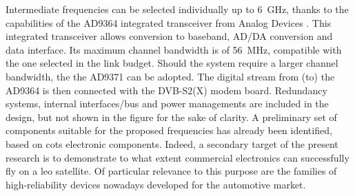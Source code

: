 \documentclass[conference,10pt,a4paper]{IEEEtran}%
\begin{document}
Intermediate frequencies can be selected individually up to \SI{6}{GHz}, thanks to the capabilities of the AD9364 integrated transceiver from Analog Devices \cite{analog}.
This integrated transceiver allows conversion to baseband, AD/DA conversion and data interface.
Its maximum channel bandwidth is of \SI{56}{MHz}, compatible with the one selected in the link budget.
Should the system require a larger channel bandwidth, the the AD9371 can be adopted.
The digital stream from (to) the AD9364 is then connected with the DVB-S2(X) modem board.
Redundancy systems, internal interfaces/bus and power managements are included in the design, but not shown in the figure for the sake of clarity.
A preliminary set of components suitable for the proposed frequencies has already been identified, based on \ac{cots} electronic components.
Indeed, a secondary target of the present research is to demonstrate to what extent commercial electronics can successfully fly on a \ac{leo} satellite.
Of particular relevance to this purpose are the families of high-reliability devices nowadays developed for the automotive market.

\end{document}
